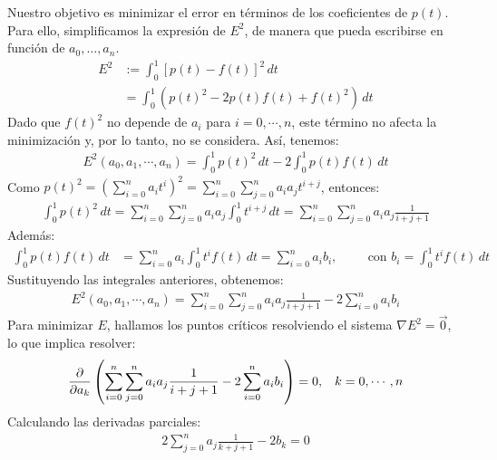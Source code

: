 \begin{homeworkProblem}
\begin{solucion}
\begin{enumerate}[a)]
          Nuestro objetivo es minimizar el error en términos de los coeficientes de \( p(t) \). Para ello, simplificamos la expresión de \( E^2 \), de manera que pueda escribirse en función de \( a_0, \ldots, a_n \).
          \begin{align*}
            E^2 & := \int_0^1 [p(t) - f(t)]^2 \, dt \\
            & = \int_0^1 \left( p(t)^2 - 2p(t)f(t) + f(t)^2 \right) \, dt
          \end{align*}
          Dado que \( f(t)^2 \) no depende de \( a_i \) para \( i = 0, \cdots, n \), este término no afecta la minimización y, por lo tanto, no se considera. Así, tenemos:
          \begin{align*}
            E^2(a_0, a_1, \cdots ,a_n) = \int_0^1 p(t)^2 \, dt - 2\int_0^1 p(t)f(t) \, dt
          \end{align*}
          Como \( p(t)^2 = \left( \sum_{i=0}^n a_i t^i \right)^2 = \sum_{i=0}^n \sum_{j=0}^n a_i a_j t^{i+j} \), entonces:
          \begin{align*}
            \int_0^1 p(t)^2 \, dt = \sum_{i=0}^n \sum_{j=0}^n a_i a_j \int_0^1 t^{i+j} \, dt = \sum_{i=0}^n \sum_{j=0}^n a_i a_j \frac{1}{i+j+1}
          \end{align*}
          Además:
          \begin{align*}
            \int_0^1 p(t)f(t) \, dt & = \sum_{i=0}^n a_i \int_0^1 t^i f(t) \, dt = \sum_{i=0}^n a_i b_i, \hspace{1cm} \text{con } b_i = \int_0^1 t^i f(t) \, dt
          \end{align*}
          Sustituyendo las integrales anteriores, obtenemos:
          \begin{align*}
            E^2(a_0, a_1, \cdots ,a_n) = \sum_{i=0}^n \sum_{j=0}^n a_i a_j \frac{1}{i+j+1} - 2\sum_{i=0}^n a_i b_i
          \end{align*}
          Para minimizar \( E \), hallamos los puntos críticos resolviendo el sistema \( \nabla E^2 = \vec{0} \), lo que implica resolver:
          \begin{align*}
            \frac{\partial}{\partial a_k} \left( \sum_{i=0}^n \sum_{j=0}^n a_i a_j \frac{1}{i+j+1} - 2\sum_{i=0}^n a_i b_i \right) = 0, \hspace{0.3cm} k = 0, \cdots, n
          \end{align*}
          Calculando las derivadas parciales:
          \begin{align*}
            2\sum_{j=0}^n a_j \frac{1}{k+j+1} - 2b_k = 0
          \end{align*}

\end{enumerate}
\end{solucion}
\end{homeworkProblem}
